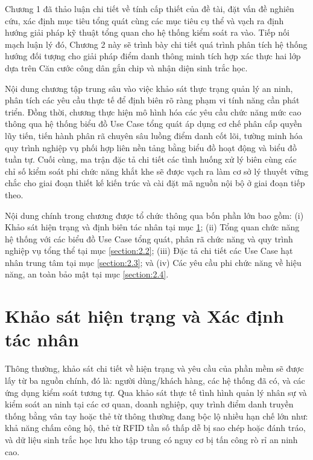 \documentclass[../DoAn.tex]{subfiles}
\begin{document}
Chương 1 đã thảo luận chi tiết về tính cấp thiết của đề tài, đặt vấn đề nghiên cứu, xác định mục tiêu tổng quát cùng các mục tiêu cụ thể và vạch ra định hướng giải pháp kỹ thuật tổng quan cho hệ thống kiểm soát ra vào. Tiếp nối mạch luận lý đó, Chương 2 này sẽ trình bày chi tiết quá trình phân tích hệ thống hướng đối tượng cho giải pháp điểm danh thông minh tích hợp xác thực hai lớp dựa trên Căn cước công dân gắn chip và nhận diện sinh trắc học. 

Nội dung chương tập trung sâu vào việc khảo sát thực trạng quản lý an ninh, phân tích các yêu cầu thực tế để định biên rõ ràng phạm vi tính năng cần phát triển. Đồng thời, chương thực hiện mô hình hóa các yêu cầu chức năng mức cao thông qua hệ thống biểu đồ Use Case tổng quát áp dụng cơ chế phân cấp quyền lũy tiến, tiến hành phân rã chuyên sâu luồng điểm danh cốt lõi, tường minh hóa quy trình nghiệp vụ phối hợp liên nền tảng bằng biểu đồ hoạt động và biểu đồ tuần tự. Cuối cùng, ma trận đặc tả chi tiết các tình huống xử lý biên cùng các chỉ số kiểm soát phi chức năng khắt khe sẽ được vạch ra làm cơ sở lý thuyết vững chắc cho giai đoạn thiết kế kiến trúc và cài đặt mã nguồn nội bộ ở giai đoạn tiếp theo.

Nội dung chính trong chương được tổ chức thông qua bốn phần lớn bao gồm: (i) Khảo sát hiện trạng và định biên tác nhân tại mục \ref{section:2.1}; (ii) Tổng quan chức năng hệ thống với các biểu đồ Use Case tổng quát, phân rã chức năng và quy trình nghiệp vụ tổng thể tại mục \ref{section:2.2}; (iii) Đặc tả chi tiết các Use Case hạt nhân trung tâm tại mục \ref{section:2.3}; và (iv) Các yêu cầu phi chức năng về hiệu năng, an toàn bảo mật tại mục \ref{section:2.4}.

\section{Khảo sát hiện trạng và Xác định tác nhân}
\label{section:2.1}

Thông thường, khảo sát chi tiết về hiện trạng và yêu cầu của phần mềm sẽ được lấy từ ba nguồn chính, đó là: người dùng/khách hàng, các hệ thống đã có, và các ứng dụng kiểm soát tương tự. Qua khảo sát thực tế tình hình quản lý nhân sự và kiểm soát an ninh tại các cơ quan, doanh nghiệp, quy trình điểm danh truyền thống bằng vân tay hoặc thẻ từ thông thường đang bộc lộ nhiều hạn chế lớn như: khả năng chấm công hộ, thẻ từ RFID tần số thấp dễ bị sao chép hoặc đánh tráo, và dữ liệu sinh trắc học lưu kho tập trung có nguy cơ bị tấn công rò rỉ an ninh cao.
\end{document}
